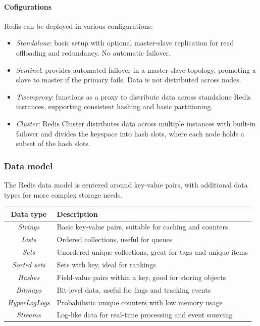 \paragraph*{Cofigurations}
Redis can be deployed in various configurations:
\begin{itemize}
    \item \textit{Standalone}: basic setup with optional master-slave replication for read offloading and redundancy. 
        No automatic failover.
    \item \textit{Sentinel}: provides automated failover in a master-slave topology, promoting a slave to master if the primary fails. 
        Data is not distributed across nodes.
    \item \textit{Twemproxy}: functions as a proxy to distribute data across standalone Redis instances, supporting consistent hashing and basic partitioning.
    \item \textit{Cluster}: Redis Cluster distributes data across multiple instances with built-in failover and divides the keyspace into hash slots, where each node holds a subset of the hash slots.
\end{itemize}

\subsubsection{Data model}
The Redis data model is centered around key-value pairs, with additional data types for more complex storage needs.
\begin{table}[H]
    \centering
    \begin{tabular}{|c|l|}
    \hline
    \textbf{Data type} & \textbf{Description} \\ \hline
    \textit{Strings}            & Basic key-value pairs, suitable for caching and counters \\ \hline
    \textit{Lists}              & Ordered collections, useful for queues \\ \hline
    \textit{Sets}               & Unordered unique collections, great for tags and unique items \\ \hline
    \textit{Sorted sets}        & Sets with key, ideal for rankings \\ \hline
    \textit{Hashes}             & Field-value pairs within a key, good for storing objects \\ \hline
    \textit{Bitmaps}            & Bit-level data, useful for flags and tracking events \\ \hline
    \textit{HyperLogLogs}       & Probabilistic unique counters with low memory usage \\ \hline
    \textit{Streams}            & Log-like data for real-time processing and event sourcing \\ \hline
    \end{tabular}
\end{table}


